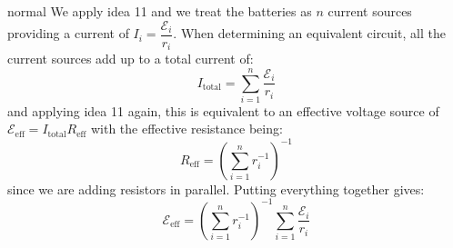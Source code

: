 \begin{solution}{normal}
We apply idea 11 and we treat the batteries as $n$ current sources providing a current of $I_i = \dfrac{\mathcal{E}_i}{r_i}$. When determining an equivalent circuit, all the current sources add up to a total current of:
$$I_\text{total} = \sum_{i=1}^n \frac{\mathcal{E}_i}{r_i}$$and applying idea 11 again, this is equivalent to an effective voltage source of $\mathcal{E}_\text{eff} = I_\text{total}R_\text{eff}$ with the effective resistance being:
$$R_\text{eff} = \left(\sum_{i=1}^nr_i^{-1}\right)^{-1}$$since we are adding resistors in parallel. Putting everything together gives:
$$\mathcal{E}_\text{eff} = \left(\sum_{i=1}^nr_i^{-1}\right)^{-1}\sum_{i=1}^n \frac{\mathcal{E}_i}{r_i}$$
\end{solution}